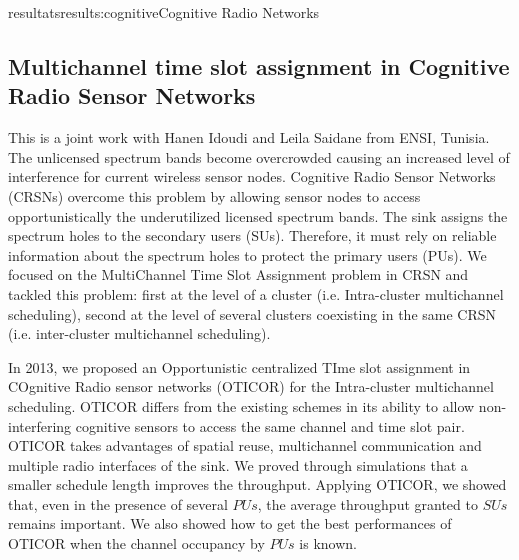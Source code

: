 \documentclass{ra2016}
\begin{document}
\begin{module}{resultats}{results:cognitive}{Cognitive Radio Networks}

\subsection{Multichannel time slot assignment in Cognitive Radio Sensor Networks}

\begin{participants}
\end{participants}

This is a joint work with Hanen Idoudi and Leila Saidane from ENSI, Tunisia.\\

The unlicensed spectrum bands become
overcrowded causing an increased level of interference for
current wireless sensor nodes. Cognitive Radio Sensor Networks
(CRSNs) overcome this problem by allowing sensor nodes to
access opportunistically the underutilized licensed spectrum
bands. The sink assigns the spectrum holes to the secondary
users (SUs). Therefore, it must rely on reliable information about
the spectrum holes to protect the primary users (PUs).
We focused on the MultiChannel Time Slot Assignment problem in CRSN and tackled this problem: first at the level of a cluster (i.e. Intra-cluster multichannel scheduling), second at the level of several clusters coexisting in the same CRSN (i.e. inter-cluster multichannel scheduling).
 

In 2013, we proposed an Opportunistic centralized TIme slot assignment in COgnitive Radio sensor networks (OTICOR) for the Intra-cluster multichannel scheduling. OTICOR differs from the existing schemes in its ability to allow non-interfering cognitive sensors to access the same channel and time slot pair. OTICOR takes advantages of spatial reuse, multichannel communication and multiple radio interfaces of the sink. We proved through simulations that a smaller schedule length improves the throughput. Applying OTICOR, we showed that, even in the presence of several $PUs$, the average throughput granted to $SUs$ remains important. We also showed how to get the best performances of OTICOR when the channel occupancy by $PUs$ is known.


\end{module}
\end{document}
